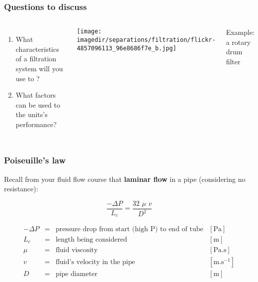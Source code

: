 \begin{frame}\frametitle{Questions to discuss}
	\begin{columns}[t]
			\begin{enumerate}
				\item	What characteristics of a filtration system will you use to {}?

				\vspace{36pt}
				\item	What factors can be used to {} the units's performance?
			\end{enumerate}
			\begin{center}
				\texttt{[image: \\imagedir/separations/filtration/flickr-4857096113\_96e8686f7e\_b.jpg]}
			\end{center}
			Example: a rotary drum filter
	\end{columns}
\end{frame}

\begin{frame}\frametitle{Poiseuille's law}
	Recall from your fluid flow course that \textbf{laminar flow} in a pipe (considering no resistance):
	\begin{exampleblock}{}
		\[\dfrac{-\Delta P}{L_c} = \dfrac{32\,\, \mu\,\, v}{D^2} \label{P}
		\]
	\end{exampleblock}
	\[
		\begin{array}{rcll}
			-\Delta P&=& \text{pressure drop from start (high P) to end of tube}&[\text{Pa}]\\
			L_c	    &=& \text{length being considered}                     	&[\text{m}]\\
			\mu 	&=& \text{fluid viscosity}  							&[\text{Pa.s}]\\
			v   	&=& \text{fluid's velocity in the pipe}					&[\text{m.s}^{-1}]\\
			D 		&=& \text{pipe diameter} 								&[\text{m}]
		\end{array}
	\]
\end{frame}

